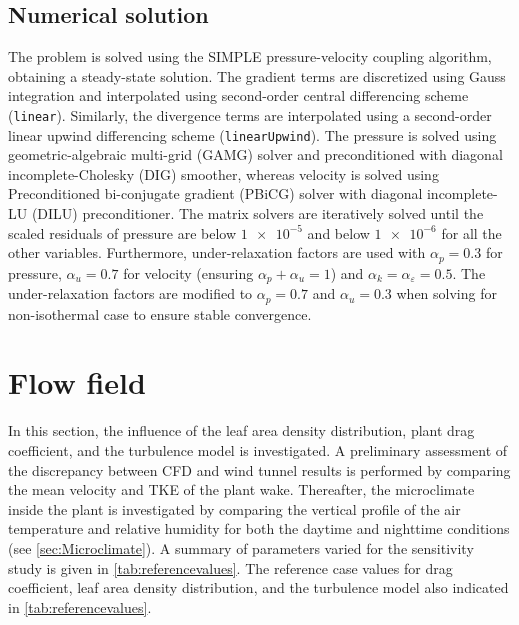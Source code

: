 \subsection{Numerical solution}
\label{subsec:numericalsolution_wtcomp}
The problem is solved using the SIMPLE pressure-velocity coupling algorithm, obtaining a steady-state solution. The gradient terms are discretized using Gauss integration and interpolated using second-order central differenc\-ing sch\-eme (\texttt{linear}). Similarly, the divergence terms are interpolated using a second-order linear upwind differenc\-ing scheme (\texttt{linearUpwind}). The pressure is solved using geometric-algebraic multi-grid (GAMG) solver and preconditioned with diagonal incomplete-Cholesky (DIG) smoother, whereas velocity is solved using Preconditioned bi-conjugate gradient (PBiCG) solver with diagonal in\-comp\-lete-LU (DILU) pre\-conditioner. The matrix solvers are iterative\-ly solved until the scaled residuals of pressure are below $\num{1e-5}$ and below $\num{1e-6}$ for all the other variables. Furthermore, under-relaxation factors are used with $\alpha_p = 0.3$ for pressure, $\alpha_u = 0.7$ for velocity (ensuring $\alpha_p + \alpha_u = 1$) and $\alpha_k = \alpha_{\varepsilon}=0.5$. The under-relaxation factors are modified to $\alpha_p=0.7$ and $\alpha_u=0.3$ when solving for non-iso\-thermal case to ensure stable convergence.

\section{Flow field}
\label{sec:flowfield}
In this section, the influence of the leaf area density distribution, plant drag coefficient, and the turbulence model is investigated. A preliminary assessment of the discrepancy between CFD and wind tunnel results is performed by comparing the mean velocity and TKE of the plant wake. Thereafter, the microclimate inside the plant is investigated by comparing the vertical profile of the air temperature and relative humidity for both the daytime and nighttime conditions (see \cref{sec:Microclimate}). A summary of parameters varied for the sensitivity study is given in \cref{tab:referencevalues}. The reference case values for drag coefficient, leaf area density distribution, and the turbulence model also indicated in \cref{tab:referencevalues}.



